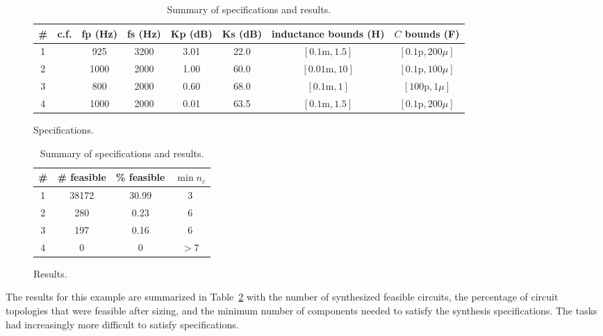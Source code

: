 \begin{table}[ht]
\centering
\begin{subfigure}[t]{\textwidth}
\centering
\begin{tabular}{cccccccc}
\hline \hline
\# & c.f. & \gls{fp} (Hz) & \gls{fs} (Hz) & \gls{Kp} (dB) & \gls{Ks} (dB) & \gls{inductance} bounds (H) & $C$ bounds (F) \\
\hline
1 & \cite{Lohn1999a, Goh2001a} & 925 & 3200 & 3.01 & 22.0 & $\left[0.1\text{m}, 1.5\right]$ & $\left[0.1\text{p}, 200\mu\right]$ \\ %
2 & \cite{Gan2010a} & 1000 & 2000 & 1.00 & 60.0 & $\left[0.01\text{m}, 10\right]$ &$ \left[0.1\text{p}, 100\mu\right]$ \\ %
3 & \cite{Das2007a} & 800 & 2000 & 0.60 & 68.0 & $\left[0.1\text{m}, 1\right]$ & $\left[100\text{p}, 1\mu\right]$ \\ %
4 & \cite{Lohn1999a, Goh2001a} & 1000 & 2000 & 0.01 & 63.5 & $\left[0.1\text{m}, 1.5\right]$ & $\left[0.1\text{p}, 200\mu\right]$ \\
\hline \hline
\end{tabular}
\caption{Specifications.}
\end{subfigure}
\begin{subfigure}[t]{\textwidth}
\centering
\begin{tabular}{cccc}
\hline \hline
\# & \# feasible & \% feasible & $\min n_c$ \\
\hline
1 & 38172 & 30.99 & 3   \\ %
2 & 280 & 0.23 & 6 \\ %
3 & 197 & 0.16 & 6 \\ %
4 & 0 & 0 & $>7$ \\
\hline \hline
\end{tabular}
\caption{Results.}
\end{subfigure}

\caption[ specifications and results.]{Summary of  specifications and results.\label{tb:ch6:lpfspecs}}

\end{table}

The results for this example are summarized in Table~\ref{tb:ch6:lpfspecs} with the number of synthesized feasible circuits, the percentage of circuit topologies that were feasible after sizing, and the minimum number of components needed to satisfy the synthesis specifications.
The tasks had increasingly more difficult to satisfy specifications.


